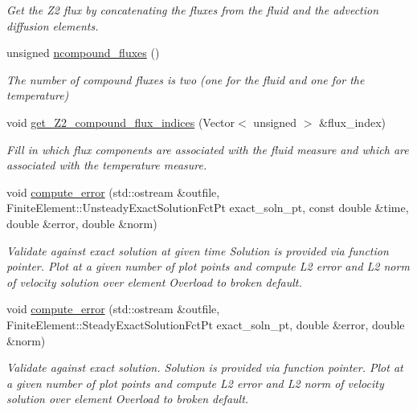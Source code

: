 \begin{DoxyCompactItemize}
\begin{DoxyCompactList}\small\item\em Get the Z2 flux by concatenating the fluxes from the fluid and the advection diffusion elements. \end{DoxyCompactList}\item 
unsigned \hyperlink{classoomph_1_1RefineableBuoyantQCrouzeixRaviartElement_a395397240c5745ad7ed66ce6f66b5d99}{ncompound\+\_\+fluxes} ()
\begin{DoxyCompactList}\small\item\em The number of compound fluxes is two (one for the fluid and one for the temperature) \end{DoxyCompactList}\item 
void \hyperlink{classoomph_1_1RefineableBuoyantQCrouzeixRaviartElement_ac8b5c8d8df0dc6d7af67570c609f591b}{get\+\_\+\+Z2\+\_\+compound\+\_\+flux\+\_\+indices} (Vector$<$ unsigned $>$ \&flux\+\_\+index)
\begin{DoxyCompactList}\small\item\em Fill in which flux components are associated with the fluid measure and which are associated with the temperature measure. \end{DoxyCompactList}\item 
void \hyperlink{classoomph_1_1RefineableBuoyantQCrouzeixRaviartElement_ad239e9a0ebe88136d68e1521fc51e0bb}{compute\+\_\+error} (std\+::ostream \&outfile, Finite\+Element\+::\+Unsteady\+Exact\+Solution\+Fct\+Pt exact\+\_\+soln\+\_\+pt, const double \&time, double \&error, double \&norm)
\begin{DoxyCompactList}\small\item\em Validate against exact solution at given time Solution is provided via function pointer. Plot at a given number of plot points and compute L2 error and L2 norm of velocity solution over element Overload to broken default. \end{DoxyCompactList}\item 
void \hyperlink{classoomph_1_1RefineableBuoyantQCrouzeixRaviartElement_a078039343f5f9bb467a1183f725d1873}{compute\+\_\+error} (std\+::ostream \&outfile, Finite\+Element\+::\+Steady\+Exact\+Solution\+Fct\+Pt exact\+\_\+soln\+\_\+pt, double \&error, double \&norm)
\begin{DoxyCompactList}\small\item\em Validate against exact solution. Solution is provided via function pointer. Plot at a given number of plot points and compute L2 error and L2 norm of velocity solution over element Overload to broken default. \end{DoxyCompactList}\item 

\end{DoxyCompactItemize}
